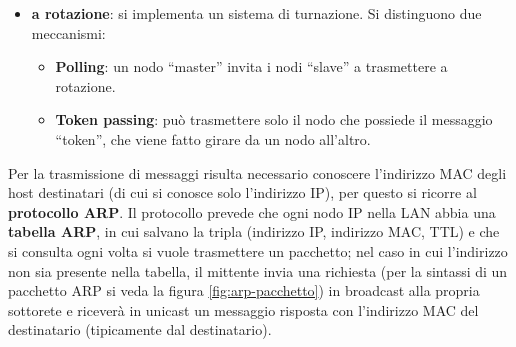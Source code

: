 \documentclass[11pt, italian, openany]{book}
\begin{document}
\begin{sloppypar}
\begin{itemize}[itemsep=0pt,topsep=0pt,parsep=0pt]
\begin{itemize}
		consentita; gli svantaggi le collisioni, lo spreco di slot e il fatto che - in media - un canale trasmetta con successo il 37\% del tempo se
		molti nodi sono attivi contemporaneamente.
		\item \textbf{Unslotted ALOHA}: non si sincronizzano i nodi sugli slot, ogni nodo trasmette non appena ha dati da inviare.
		\item \textbf{Carrier Sense Multiple Access}: si trasmette solo se il canale \`e libero, si attene altrimenti. Le collisioni possono ancora avvenire,
		si introducono meccanismi di \textbf{collision detection} e si interrompe la trasmissione non appena se ne rilevano.
	\end{itemize}
	Si veda inoltre la figura \ref{fig:link-accesso-casuale}.
	\item \textbf{a rotazione}: si implementa un sistema di turnazione. Si distinguono due meccanismi:
	\begin{itemize}
		\item \textbf{Polling}: un nodo ``master'' invita i nodi ``slave'' a trasmettere a rotazione.
		\item \textbf{Token passing}: pu\`o trasmettere solo il nodo che possiede il messaggio ``token'', che viene fatto girare da un nodo all'altro.
	\end{itemize}
\end{itemize}

Per la trasmissione di messaggi risulta necessario conoscere l'indirizzo MAC degli host destinatari (di cui si conosce solo l'indirizzo IP), per questo si
ricorre al \textbf{protocollo ARP}. Il protocollo prevede che ogni nodo IP nella LAN abbia una \textbf{tabella ARP}, in cui salvano la tripla (indirizzo IP,
indirizzo MAC, TTL) e che si consulta ogni volta si vuole trasmettere un pacchetto; nel caso in cui l'indirizzo non sia presente nella tabella, il mittente
invia una richiesta (per la sintassi di un pacchetto ARP si veda la figura \ref{fig:arp-pacchetto}) in broadcast alla propria sottorete e ricever\`a in
unicast un messaggio risposta con l'indirizzo MAC del destinatario (tipicamente dal destinatario).


\end{sloppypar}
\end{document}

